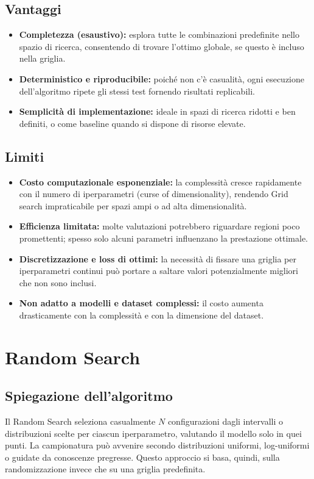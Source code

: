 \documentclass[a4paper,12pt]{report}
\begin{document}
	\subsection{Vantaggi}
	\begin{itemize}
		\item \textbf{Completezza (esaustivo):} esplora tutte le combinazioni predefinite nello spazio di ricerca, consentendo di trovare l’ottimo globale, se questo è incluso nella griglia.
		\item \textbf{Deterministico e riproducibile:} poiché non c'è casualità, ogni esecuzione dell'algoritmo ripete gli stessi test fornendo risultati replicabili.
		\item \textbf{Semplicità di implementazione:} ideale in spazi di ricerca ridotti e ben definiti, o come baseline quando si dispone di risorse elevate.
	\end{itemize}
	
	\subsection{Limiti}
	\begin{itemize}
		\item \textbf{Costo computazionale esponenziale:} la complessità cresce rapidamente con il numero di iperparametri (curse of dimensionality), rendendo Grid search impraticabile per spazi ampi o ad alta dimensionalità.
		\item \textbf{Efficienza limitata:} molte valutazioni potrebbero riguardare regioni poco promettenti; spesso solo alcuni parametri influenzano la prestazione ottimale.
		\item \textbf{Discretizzazione e loss di ottimi:} la necessità di fissare una griglia per iperparametri continui può portare a saltare valori potenzialmente migliori che non sono inclusi.
		\item \textbf{Non adatto a modelli e dataset complessi:} il costo aumenta drasticamente con la complessità e con la dimensione del dataset.
	\end{itemize}
	
	\section{Random Search}
	\subsection{Spiegazione dell'algoritmo}
	Il Random Search seleziona casualmente $N$ configurazioni dagli intervalli o distribuzioni scelte per ciascun iperparametro, valutando il modello solo in quei punti. La campionatura può avvenire secondo distribuzioni uniformi, log-uniformi o guidate da conoscenze pregresse. Questo approccio si basa, quindi, sulla randomizzazione invece che su una griglia predefinita.
	
\end{document}
